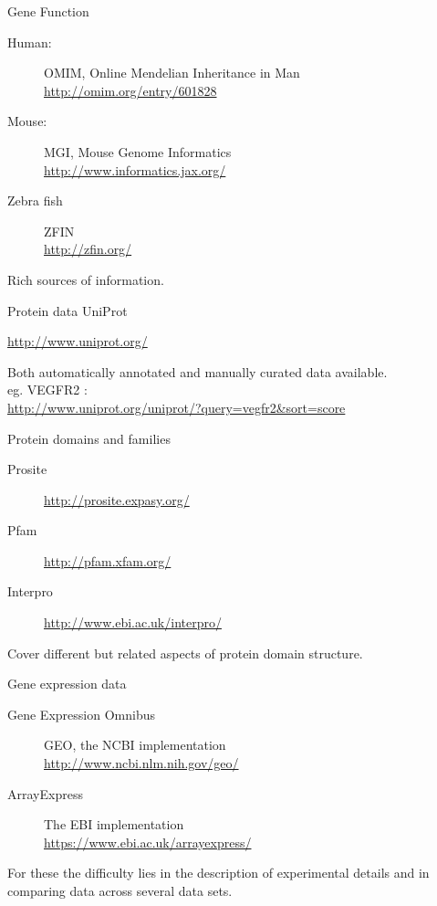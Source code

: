 \documentclass[pdf]{beamer}
\begin{document}
\begin{frame}{Gene Function}
  \begin{description}
    \item[Human:] OMIM, Online Mendelian Inheritance in Man\\
      \url{http://omim.org/entry/601828}\\
    \item[Mouse:] MGI, Mouse Genome Informatics\\
      \url{http://www.informatics.jax.org/}
    \item[Zebra fish] ZFIN\\
      \url{http://zfin.org/}
  \end{description}
  
  Rich sources of information.
\end{frame}

\begin{frame}{Protein data}
  UniProt

  \url{http://www.uniprot.org/}

  Both automatically annotated and manually curated data available.\\
  \vspace{1ex}
  eg. VEGFR2 :\\
  {\small
  \url{http://www.uniprot.org/uniprot/?query=vegfr2&sort=score}
}
\end{frame}

\begin{frame}{Protein domains and families}
  \begin{description}
    \item[Prosite]
      \url{http://prosite.expasy.org/}  
    \item[Pfam]
      \url{http://pfam.xfam.org/}
    \item[Interpro]
      \url{http://www.ebi.ac.uk/interpro/}
  \end{description}

  Cover different but related aspects of protein domain structure.
\end{frame}

\begin{frame}{Gene expression data}
  \begin{description}
    \item[Gene Expression Omnibus] GEO, the NCBI implementation\\
      \url{http://www.ncbi.nlm.nih.gov/geo/}
    \item[ArrayExpress] The EBI implementation\\
      \url{https://www.ebi.ac.uk/arrayexpress/}
  \end{description}
  
  For these the difficulty lies in the description of experimental
  details and in comparing data across several data sets.
\end{frame}
\end{document}
